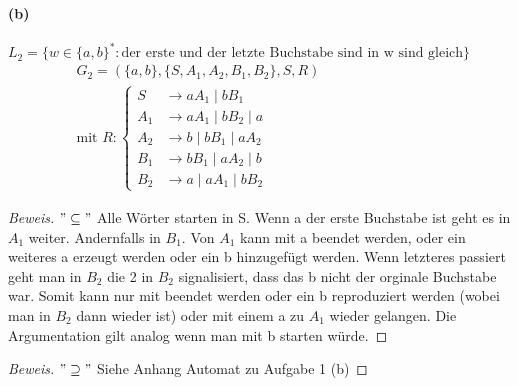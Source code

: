 \documentclass[titlepage]{article}
\renewcommand{\]}{\right]}
\renewcommand{\[}{\left[}
\renewcommand{\)}{\right)}
\renewcommand{\(}{\left(}
\renewcommand{\|}{\;|\;}
\begin{document}
		
		
		\paragraph{(b)} $L_2=\{w\in\{a,b\}^*:\text{der erste und der letzte Buchstabe sind in w sind gleich}\}$
			\begin{align*}
			G_2=(\{a,b\},\{S,A_1,A_2,B_1,B_2\},S,R)&&&&&&&&&&&\\
			\text{mit }R:
			\begin{cases}
				S&\rightarrow aA_1\|bB_1\\
				A_1&\rightarrow aA_1\|bB_2\|a\\
				A_2&\rightarrow b\|bB_1\|aA_2\\
				B_1&\rightarrow bB_1\|aA_2\|b\\
				B_2&\rightarrow a\|aA_1\|bB_2
			\end{cases}
		\end{align*}
		\begin{proof}[Beweis] $"\subseteq"$
			Alle Wörter starten in S. Wenn a der erste Buchstabe ist geht es in $A_1$ weiter. Andernfalls in $B_1$. Von $A_1$ kann mit a beendet werden, oder ein weiteres a erzeugt werden oder ein b hinzugefügt werden. Wenn letzteres passiert geht man in $B_2$ die 2 in $B_2$ signalisiert, dass das b nicht der orginale Buchstabe war. Somit kann nur mit beendet werden oder ein b reproduziert werden (wobei man in $B_2$ dann wieder ist) oder mit einem a zu $A_1$ wieder gelangen. Die Argumentation gilt analog wenn man mit b starten würde.
		\end{proof}
		\begin{proof}[Beweis] $"\supseteq"$
			Siehe Anhang Automat zu Aufgabe 1 (b)
		\end{proof}
		
		
\end{document}
